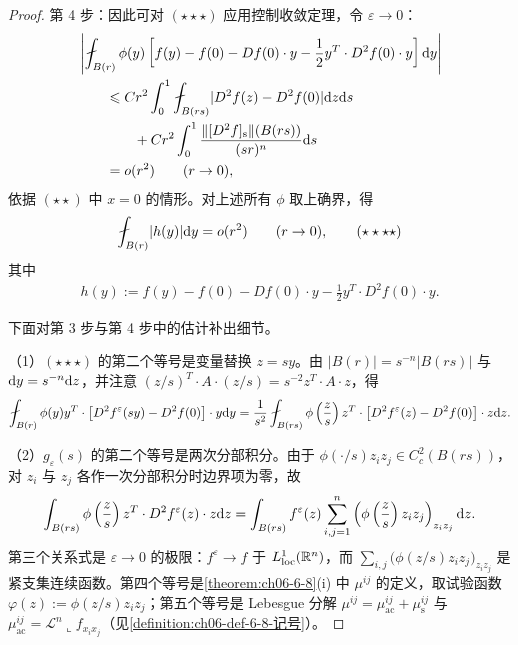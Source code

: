 \documentclass[../../main.tex]{subfiles}%
\begin{document}
\begin{proof}
第 4 步：因此可对 $(\star\star\star)$ 应用控制收敛定理，令 $\varepsilon\to0$：
\begin{align*}
&\left|\fint_{B(r)}\phi(y)\left[f(y)-f(0)-Df(0)\cdot y-\frac{1}{2}y^{T}\cdot D^{2}f(0)\cdot y\right]\diff y\right|\\
&\qquad\leqslant Cr^{2}\int_{0}^{1}\fint_{B(rs)}\lvert D^{2}f(z)-D^{2}f(0)\rvert\diff z\diff s\\
&\qquad\qquad+Cr^{2}\int_{0}^{1}\frac{\lVert[D^{2}f]_{\mathrm{s}}\rVert(B(rs))}{(sr)^{n}}\diff s\\
&\qquad=o(r^{2})\qquad(r\to0),
\end{align*}
依据 $(\star\star)$ 中 $x=0$ 的情形。对上述所有 $\phi$ 取上确界，得
\begin{align*}
\fint_{B(r)}\lvert h(y)\rvert\diff y=o(r^{2})\qquad(r\to0),\qquad(\star\star\star\star)
\end{align*}
其中
\begin{align*}
h(y):=f(y)-f(0)-Df(0)\cdot y-\frac{1}{2}y^{T}\cdot D^{2}f(0)\cdot y.
\end{align*}

下面对第 3 步与第 4 步中的估计补出细节。

（1）$(\star\star\star)$ 的第二个等号是变量替换 $z=sy$。由 $\lvert B(r)\rvert=s^{-n}\lvert B(rs)\rvert$ 与 $\mathrm{d} y=s^{-n}\mathrm{d} z$，并注意 $(z/s)^{T}\cdot A\cdot(z/s)=s^{-2}z^{T}\cdot A\cdot z$，得
\begin{align*}
\fint_{B(r)}\phi(y)y^{T}\cdot\bigl[D^{2}f^{\varepsilon}(sy)-D^{2}f(0)\bigr]\cdot y\diff y
=\frac{1}{s^{2}}\fint_{B(rs)}\phi\left(\frac{z}{s}\right)z^{T}\cdot\bigl[D^{2}f^{\varepsilon}(z)-D^{2}f(0)\bigr]\cdot z\diff z.
\end{align*}

（2）$g_{\varepsilon}(s)$ 的第二个等号是两次分部积分。由于 $\phi(\cdot/s)z_{i}z_{j}\in C_{c}^{2}(B(rs))$，对 $z_{i}$ 与 $z_{j}$ 各作一次分部积分时边界项为零，故
\begin{align*}
\int_{B(rs)}\phi\left(\frac{z}{s}\right)z^{T}\cdot D^{2}f^{\varepsilon}(z)\cdot z\mathrm{d} z
=\int_{B(rs)}f^{\varepsilon}(z)\sum_{i,j=1}^{n}\left(\phi\left(\frac{z}{s}\right)z_{i}z_{j}\right)_{z_{i}z_{j}}\mathrm{d} z.
\end{align*}
第三个关系式是 $\varepsilon\to0$ 的极限：$f^{\varepsilon}\to f$ 于 $L^{1}_{\mathrm{loc}}(\mathbb{R}^{n})$，而 $\sum_{i,j}\bigl(\phi(z/s)z_{i}z_{j}\bigr)_{z_{i}z_{j}}$ 是紧支集连续函数。第四个等号是\cref{theorem:ch06-6-8}(i) 中 $\mu^{ij}$ 的定义，取试验函数 $\varphi(z):=\phi(z/s)z_{i}z_{j}$；第五个等号是 Lebesgue 分解 $\mu^{ij}=\mu^{ij}_{\mathrm{ac}}+\mu^{ij}_{\mathrm{s}}$ 与 $\mu^{ij}_{\mathrm{ac}}=\mathcal{L}^{n}\llcorner f_{x_{i}x_{j}}$（见\cref{definition:ch06-def-6-8-记号}）。%


\end{proof}
\end{document}
